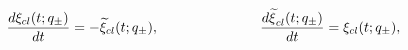 \begin{equation}
\label{classicalfermions}
\frac{d\xi_{cl}(t;q_{\pm})}{dt} = -{\widetilde \xi}_{cl}(t;q_{\pm}),
\hspace{1.0in}
\frac{{d\widetilde \xi}_{cl}(t;q_{\pm})}{dt} = \xi_{cl}(t;q_{\pm}),
\end{equation}

